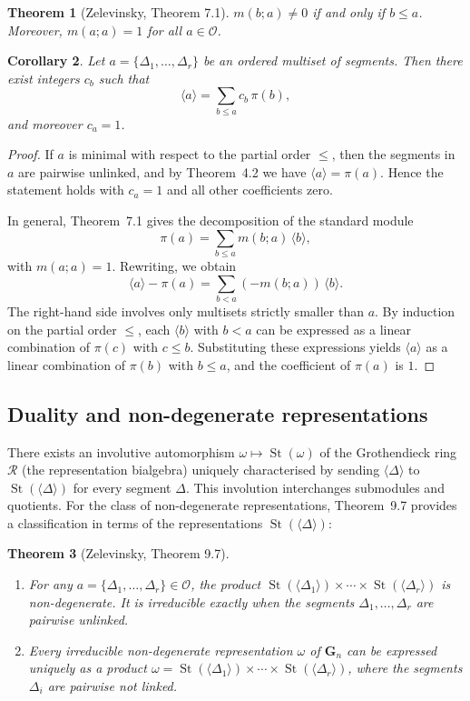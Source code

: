\documentclass[12pt]{article}
\newtheorem{theorem}{Theorem}[section]
\newtheorem{corollary}[theorem]{Corollary}
\theoremstyle{remark}
\begin{document}
\begin{theorem}[Zelevinsky, Theorem 7.1]
$m(b;a)\neq 0$ if and only if $b\le a$. Moreover, $m(a;a)=1$ for all $a\in\mathcal{O}$.
\end{theorem}

\begin{corollary}
\label{cor:expansion-Zelevinsky}
Let $a = \{\Delta_1,\dots,\Delta_r\}$ be an ordered multiset of segments. Then there exist integers $c_b$ such that
\[
\langle a \rangle = \sum_{b \le a} c_b \, \pi(b),
\]
and moreover $c_a = 1$.
\end{corollary}

\begin{proof}
If $a$ is minimal with respect to the partial order $\le$, then the segments in $a$ are pairwise unlinked, and by Theorem~4.2 we have $\langle a \rangle = \pi(a)$. Hence the statement holds with $c_a=1$ and all other coefficients zero.

In general, Theorem~7.1 gives the decomposition of the standard module
\[
\pi(a) = \sum_{b \le a} m(b;a) \, \langle b \rangle,
\]
with $m(a;a)=1$. Rewriting, we obtain
\[
\langle a \rangle - \pi(a) = \sum_{b < a} (-m(b;a)) \, \langle b \rangle .
\]
The right-hand side involves only multisets strictly smaller than $a$. By induction on the partial order $\le$, each $\langle b \rangle$ with $b<a$ can be expressed as a linear combination of $\pi(c)$ with $c \le b$. Substituting these expressions yields $\langle a \rangle$ as a linear combination of $\pi(b)$ with $b \le a$, and the coefficient of $\pi(a)$ is $1$.
\end{proof}

\subsection{Duality and non-degenerate representations}
There exists an involutive automorphism $\omega\mapsto \operatorname{St}(\omega)$ of the Grothendieck ring $\mathcal{R}$ (the representation bialgebra) uniquely characterised by sending $\langle\Delta\rangle$ to $\operatorname{St}(\langle\Delta\rangle)$ for every segment $\Delta$. This involution interchanges submodules and quotients. For the class of non-degenerate representations, Theorem~9.7 provides a classification in terms of the representations $\operatorname{St}(\langle\Delta\rangle)$:

\begin{theorem}[Zelevinsky, Theorem 9.7]
\begin{enumerate}
\item For any $a=\{\Delta_1,\dots,\Delta_r\}\in\mathcal{O}$, the product $\operatorname{St}(\langle\Delta_1\rangle)\times\cdots\times \operatorname{St}(\langle\Delta_r\rangle)$ is non-degenerate. It is irreducible exactly when the segments $\Delta_1,\dots,\Delta_r$ are pairwise unlinked.
\item Every irreducible non-degenerate representation $\omega$ of $\mathbf{G}_n$ can be expressed uniquely as a product $\omega = \operatorname{St}(\langle\Delta_1\rangle)\times\cdots\times \operatorname{St}(\langle\Delta_r\rangle)$, where the segments $\Delta_i$ are pairwise not linked.
\end{enumerate}
\end{theorem}
\end{document}
